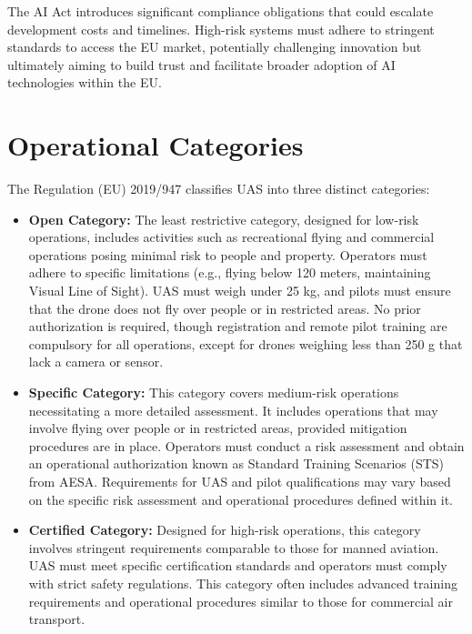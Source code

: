 The AI Act introduces significant compliance obligations that could escalate development costs and timelines. High-risk systems must adhere to stringent standards to access the EU market, potentially challenging innovation but ultimately aiming to build trust and facilitate broader adoption of AI technologies within the EU.

\section{Operational Categories}
The Regulation (EU) 2019/947 \autocite{eu-947-2019} classifies UAS into three distinct categories:

\begin{itemize}
  \item \textbf{Open Category:} The least restrictive category, designed for low-risk operations, includes activities such as recreational flying and commercial operations posing minimal risk to people and property. Operators must adhere to specific limitations (e.g., flying below 120 meters, maintaining Visual Line of Sight). UAS must weigh under 25 kg, and pilots must ensure that the drone does not fly over people or in restricted areas. No prior authorization is required, though registration and remote pilot training are compulsory for all operations, except for drones weighing less than 250 g that lack a camera or sensor.

  \item \textbf{Specific Category:} This category covers medium-risk operations necessitating a more detailed assessment. It includes operations that may involve flying over people or in restricted areas, provided mitigation procedures are in place. Operators must conduct a risk assessment and obtain an operational authorization known as Standard Training Scenarios (STS) from AESA. Requirements for UAS and pilot qualifications may vary based on the specific risk assessment and operational procedures defined within it.

  \item \textbf{Certified Category:} Designed for high-risk operations, this category involves stringent requirements comparable to those for manned aviation. UAS must meet specific certification standards and operators must comply with strict safety regulations. This category often includes advanced training requirements and operational procedures similar to those for commercial air transport.
\end{itemize}

